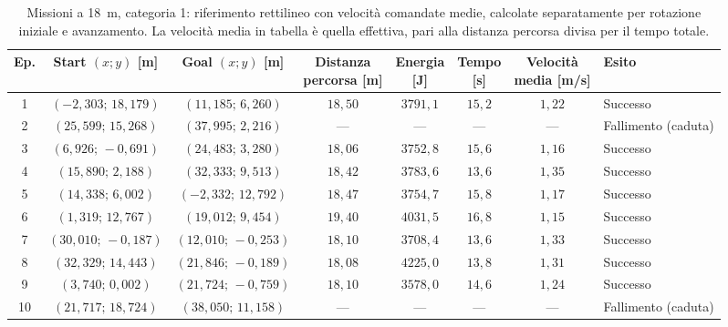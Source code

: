 \begin{table}[H]
\centering
\caption{Missioni a 18~m, categoria 1: riferimento rettilineo con velocità comandate medie, calcolate separatamente per rotazione iniziale e avanzamento. La velocità media in tabella è quella effettiva, pari alla distanza percorsa divisa per il tempo totale.}
\label{tab:straight-line-command-mean-18m-cat1}
\begingroup
\fontsize{9}{11}\selectfont
\setlength{\tabcolsep}{2.5pt}
\renewcommand{\arraystretch}{1.2}
\begin{tabular}{@{}c cc cccc l@{}}
\toprule
Ep. & \shortstack{Start $(x;y)$\\{}[m]} & \shortstack{Goal $(x;y)$\\{}[m]} & \shortstack{Distanza\\percorsa [m]} & \shortstack{Energia\\{}[J]} & \shortstack{Tempo\\{}[s]} & \shortstack{Velocità\\media [m/s]} & Esito \\
\midrule
1 & $(-2{,}303;\,18{,}179)$ & $(11{,}185;\,6{,}260)$ & $18{,}50$ & $3791{,}1$ & $15{,}2$ & $1{,}22$ & Successo \\
2 & $(25{,}599;\,15{,}268)$ & $(37{,}995;\,2{,}216)$ & --- & --- & --- & --- & Fallimento (caduta) \\
3 & $(6{,}926;\,-0{,}691)$ & $(24{,}483;\,3{,}280)$ & $18{,}06$ & $3752{,}8$ & $15{,}6$ & $1{,}16$ & Successo \\
4 & $(15{,}890;\,2{,}188)$ & $(32{,}333;\,9{,}513)$ & $18{,}42$ & $3783{,}6$ & $13{,}6$ & $1{,}35$ & Successo \\
5 & $(14{,}338;\,6{,}002)$ & $(-2{,}332;\,12{,}792)$ & $18{,}47$ & $3754{,}7$ & $15{,}8$ & $1{,}17$ & Successo \\
6 & $(1{,}319;\,12{,}767)$ & $(19{,}012;\,9{,}454)$ & $19{,}40$ & $4031{,}5$ & $16{,}8$ & $1{,}15$ & Successo \\
7 & $(30{,}010;\,-0{,}187)$ & $(12{,}010;\,-0{,}253)$ & $18{,}10$ & $3708{,}4$ & $13{,}6$ & $1{,}33$ & Successo \\
8 & $(32{,}329;\,14{,}443)$ & $(21{,}846;\,-0{,}189)$ & $18{,}08$ & $4225{,}0$ & $13{,}8$ & $1{,}31$ & Successo \\
9 & $(3{,}740;\,0{,}002)$ & $(21{,}724;\,-0{,}759)$ & $18{,}10$ & $3578{,}0$ & $14{,}6$ & $1{,}24$ & Successo \\
10 & $(21{,}717;\,18{,}724)$ & $(38{,}050;\,11{,}158)$ & --- & --- & --- & --- & Fallimento (caduta) \\
\bottomrule
\end{tabular}
\endgroup
\end{table}

